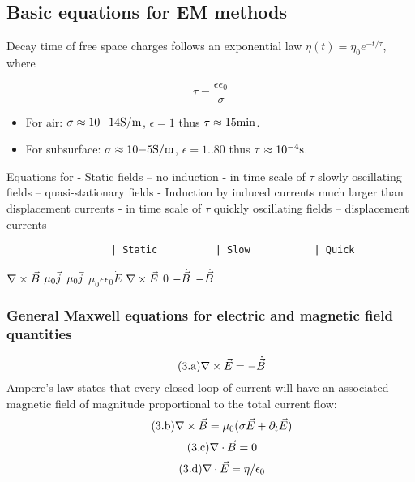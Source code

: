 \subsection{Basic equations for EM
methods}\label{basic-equations-for-em-methods}

Decay time of free space charges follows an exponential law
\(\eta(t) = \eta_0 e^{-t/\tau}\), where

\setcounter{equation}{2}\[
  \tau = \frac{\epsilon \epsilon_0}{\sigma}
\]

\begin{itemize}
\tightlist
\item
  For air: \(\sigma \approx 10{-14}\mathrm{S/m}\), \(\epsilon=1\) thus
  \(\tau \approx 15\mathrm{min}\).
\item
  For subsurface: \(\sigma \approx 10{-5}\mathrm{S/m}\),
  \(\epsilon=1..80\) thus \(\tau \approx 10^{-4}\mathrm{s}\).
\end{itemize}

Equations for - Static fields -- no induction - in time scale of
\(\tau\) slowly oscillating fields -- quasi-stationary fields -
Induction by induced currents much larger than displacement currents -
in time scale of \(\tau\) quickly oscillating fields -- displacement
currents

\begin{verbatim}
                  | Static          | Slow           | Quick
\end{verbatim}

\(\nabla\times\vec{B}\) \textbar{} \(\mu_0\vec{j}\) \textbar{}
\(\mu_0\vec{j}\) \textbar{} \(\mu_0\epsilon\epsilon_0\dot E\)
\(\nabla\times\vec{E}\) \textbar{} \(0\) \textbar{} \(-\dot{\vec{B}}\)
\textbar{} \(-\dot{\vec{B}}\)

\subsubsection{General Maxwell equations for electric and magnetic field
quantities}\label{general-maxwell-equations-for-electric-and-magnetic-field-quantities}

\setcounter{equation}{3}\[\tag{3.a}
  \nabla\times\vec{E}  = -\dot{\vec{B}}
\] Ampere's law states that every closed loop of current will have an
associated magnetic field of magnitude proportional to the total current
flow: \setcounter{equation}{3}\[\tag{3.b}
  \nabla\times\vec{B}  = \mu_0(\sigma\vec{E} + \partial_t\vec{E})
\] \setcounter{equation}{3}\[\tag{3.c}
  \nabla\cdot\vec{B}   = 0
\] \setcounter{equation}{3}\[\tag{3.d}
  \nabla\cdot\vec{E}   = \eta/\epsilon_0
\]

